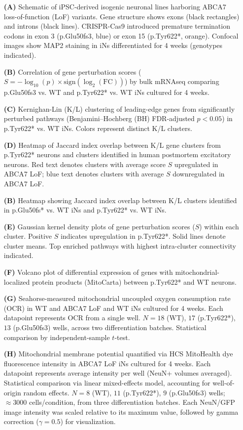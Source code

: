 \begin{itemize}
    \item[\textbf{(A)}] Schematic of iPSC-derived isogenic neuronal lines harboring ABCA7 loss-of-function (LoF) variants. Gene structure shows exons (black rectangles) and introns (black lines). CRISPR-Cas9 introduced premature termination codons in exon 3 (p.Glu50fs3, blue) or exon 15 (p.Tyr622*, orange). Confocal images show MAP2 staining in iNs differentiated for 4 weeks (genotypes indicated).
    \item[\textbf{(B)}] Correlation of gene perturbation scores ($S = -\log_{10}(p)\times\text{sign}(\log_2(\text{FC}))$) by bulk mRNAseq comparing p.Glu50fs3 vs. WT and p.Tyr622* vs. WT iNs cultured for 4 weeks.
    \item[\textbf{(C)}] Kernighan-Lin (K/L) clustering of leading-edge genes from significantly perturbed pathways (Benjamini–Hochberg (BH) FDR-adjusted $p<0.05$) in p.Tyr622* vs. WT iNs. Colors represent distinct K/L clusters.
    \item[\textbf{(D)}] Heatmap of Jaccard index overlap between K/L gene clusters from p.Tyr622* neurons and clusters identified in human postmortem excitatory neurons. Red text denotes clusters with average score $S$ upregulated in ABCA7 LoF; blue text denotes clusters with average $S$ downregulated in ABCA7 LoF.
    \item[\textbf{(B)}] Heatmap showing Jaccard index overlap between K/L clusters identified in p.Glu50fs* vs. WT iNs and p.Tyr622* vs. WT iNs.
    \item[\textbf{(E)}] Gaussian kernel density plots of gene perturbation scores ($S$) within each cluster. Positive $S$ indicates upregulation in p.Tyr622*. Solid lines denote cluster means. Top enriched pathways with highest intra-cluster connectivity indicated.
    \item[\textbf{(F)}] Volcano plot of differential expression of genes with mitochondrial-localized protein products (MitoCarta) between p.Tyr622* and WT neurons.
    \item[\textbf{(G)}] Seahorse-measured mitochondrial uncoupled oxygen consumption rate (OCR) in WT and ABCA7 LoF and WT iNs cultured for 4 weeks. Each datapoint represents OCR from a single well. $N=18$ (WT), $17$ (p.Tyr622*), $13$ (p.Glu50fs3) wells, across two differentiation batches. Statistical comparison by independent-sample $t$-test.
    \item[\textbf{(H)}] Mitochondrial membrane potential quantified via HCS MitoHealth dye fluorescence intensity in ABCA7 LoF iNs cultured for 4 weeks. Each datapoint represents average intensity per well (NeuN+ volumes averaged). Statistical comparison via linear mixed-effects model, accounting for well-of-origin random effects. $N=8$ (WT), $11$ (p.Tyr622*), $9$ (p.Glu50fs3) wells; $\approx3000$ cells/condition, from three differentiation batches. Each NeuN/GFP image intensity was scaled relative to its maximum value, followed by gamma correction ($\gamma = 0.5$) for visualization.

\end{itemize}

